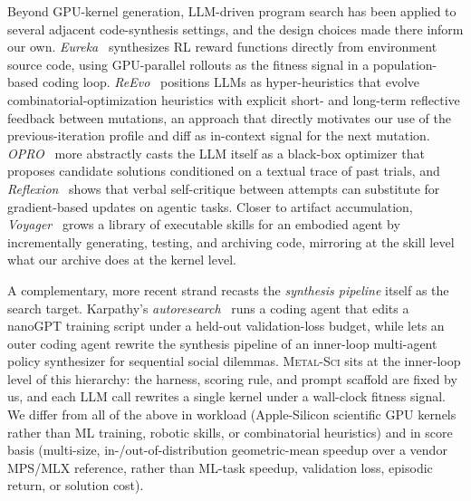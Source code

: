 \documentclass{article}
\theoremstyle{plain}
\theoremstyle{definition}
\theoremstyle{remark}
\begin{document}
Beyond GPU-kernel generation, LLM-driven program search has been
applied to several adjacent code-synthesis settings, and the design
choices made there inform our own. \emph{Eureka}~\cite{ma2024eureka}
synthesizes RL reward functions directly from environment source
code, using GPU-parallel rollouts as the fitness signal in a
population-based coding loop. \emph{ReEvo}~\cite{ye2024reevo}
positions LLMs as hyper-heuristics that evolve combinatorial-optimization
heuristics with explicit short- and long-term reflective feedback
between mutations, an approach that directly motivates our use of
the previous-iteration profile and diff as in-context signal for
the next mutation. \emph{OPRO}~\cite{yang2024opro} more abstractly
casts the LLM itself as a black-box optimizer that proposes
candidate solutions conditioned on a textual trace of past trials,
and \emph{Reflexion}~\cite{shinn2023reflexion} shows that verbal
self-critique between attempts can substitute for gradient-based
updates on agentic tasks. Closer to artifact accumulation,
\emph{Voyager}~\cite{wang2024voyager} grows a library of executable
skills for an embodied agent by incrementally generating, testing, and
archiving code, mirroring at the skill level what our archive does
at the kernel level.

A complementary, more recent strand recasts the \emph{synthesis
pipeline} itself as the search target. Karpathy's
\emph{autoresearch}~\cite{karpathy2026autoresearch} runs a coding
agent that edits a nanoGPT training script under a held-out
validation-loss budget, while \citet{gallego2026policies} lets an
outer coding agent rewrite the synthesis pipeline of an inner-loop
multi-agent policy synthesizer for sequential social dilemmas.
\textsc{Metal-Sci} sits at the inner-loop level of this hierarchy:
the harness, scoring rule, and prompt scaffold are fixed by us, and
each LLM call rewrites a single kernel under a wall-clock fitness
signal. We differ from all of the above in workload (Apple-Silicon
scientific GPU kernels rather than ML training, robotic skills, or
combinatorial heuristics) and in score basis (multi-size,
in-/out-of-distribution geometric-mean speedup over a vendor MPS/MLX
reference, rather than ML-task speedup, validation loss, episodic
return, or solution cost).
\end{document}
